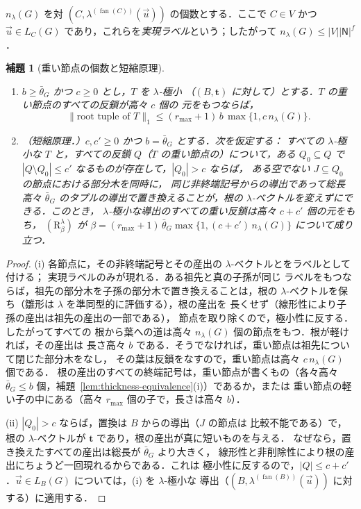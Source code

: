 \documentclass[11pt,a4paper]{ltjsarticle}
\numberwithin{equation}{section}
\theoremstyle{plain}
\newtheorem{lemma}[theorem]{補題}
\theoremstyle{definition}
\theoremstyle{remark}
\newcommand{\tuple}[1]{\vec{#1}}
\newcommand{\fan}{\operatorname{fan}}
\theoremstyle{plain}
\begin{document}
$n_\lambda(G)$ を対 $(C,\lambda^{(\fan(C))}(\tuple u))$ の個数とする．ここで $C\in V$ かつ
$\tuple u\in L_C(G)$ であり，これらを\emph{実現ラベル}という；したがって $n_\lambda(G)\le|V||\mathsf N|^f$．

\begin{lemma}[重い節点の個数と短縮原理]
\label{lem:heavy-node-count}
\begin{enumerate}[label=\textup{(\roman*)},leftmargin=*]
\item $b\ge\bar\theta_G$ かつ $c\ge0$ とし，$T$ を $\lambda$-極小
（$(B,\mathbf t)$ に対して）とする．$T$ の重い節点のすべての反鎖が高々 $c$ 個の
元をもつならば，
\[
 \|\text{root tuple of }T\|_1\le(r_{\max}+1)\,b\,\max\{1,c\,n_\lambda(G)\}.
\]
\item \emph{（短縮原理．）}$c,c'\ge0$ かつ $b=\bar\theta_G$ とする．次を仮定する：
すべての $\lambda$-極小な $T$ と，すべての反鎖 $Q$（$T$ の重い節点の）について，ある
$Q_0\subseteq Q$ で $|Q\setminus Q_0|\le c'$ なるものが存在して，$|Q_0|>c$ ならば，
ある空でない $J\subseteq Q_0$ の節点における部分木を同時に，
同じ非終端記号からの導出であって総長高々
$\bar\theta_G$ のタプルの導出で置き換えることが，根の $\lambda$-ベクトルを変えずにできる．このとき，
$\lambda$-極小な導出のすべての重い反鎖は高々 $c+c'$ 個の元をもち，
$(\mathrm R_\beta^\lambda)$ が
$\beta=(r_{\max}+1)\,\bar\theta_G\max\{1,(c+c')\,n_\lambda(G)\}$ について成り立つ．
\end{enumerate}
\end{lemma}

\begin{proof}
(i) 各節点に，その非終端記号とその産出の $\lambda$-ベクトルとをラベルとして付ける；
実現ラベルのみが現れる．ある祖先と真の子孫が同じ
ラベルをもつならば，祖先の部分木を子孫の部分木で置き換えることは，根の
$\lambda$-ベクトルを保ち（雛形は $\lambda$ を準同型的に評価する），根の産出を
長くせず（線形性により子孫の産出は祖先の産出の一部である），
節点を取り除くので，極小性に反する．したがってすべての
根から葉への道は高々 $n_\lambda(G)$ 個の節点をもつ．根が軽ければ，その産出は
長さ高々 $b$ である．そうでなければ，重い節点は祖先について閉じた部分木をなし，
その葉は反鎖をなすので，重い節点は高々 $c\,n_\lambda(G)$ 個である．
根の産出のすべての終端記号は，重い節点が書くもの（各々高々
$\bar\theta_G\le b$ 個，補題~\ref{lem:thickness-equivalence}(i)）であるか，または
重い節点の軽い子の中にある（高々 $r_{\max}$ 個の子で，長さは高々 $b$）．

(ii) $|Q_0|>c$ ならば，置換は $B$ からの導出（$J$ の節点は
比較不能である）で，根の $\lambda$-ベクトルが $\mathbf t$ であり，根の産出が真に短いものを与える．
なぜなら，置き換えたすべての産出は総長が $\bar\theta_G$ より大きく，
線形性と非削除性により根の産出にちょうど一回現れるからである．これは
極小性に反するので，$|Q|\le c+c'$．$\tuple u\in L_B(G)$ については，(i) を $\lambda$-極小な
導出（$(B,\lambda^{(\fan(B))}(\tuple u))$ に対する）に適用する．
\end{proof}
\end{document}
